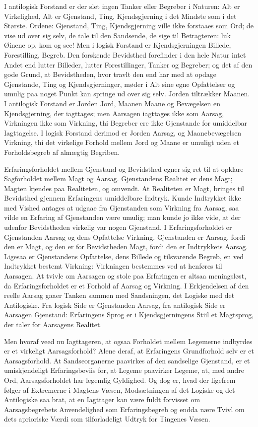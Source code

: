 \documentclass[12pt,a4paper]{book}
\begin{document}
I antilogisk Forstand er der slet ingen Tanker eller Begreber i Naturen:
Alt er Virkelighed, Alt er Gjenstand, Ting, Kjendsgjerning i det Mindste
som i det Største. Ordene: Gjenstand, Ting, Kjendsgjerning ville ikke
forstaaes som Ord; de vise ud over sig selv, de tale til den Sandsende,
de sige til Betragteren: luk Øinene op, kom og see! Men i logisk
Forstand er Kjendsgjerningen Billede, Forestilling, Begreb. Den
forskende Bevidsthed forefinder i den hele Natur intet Andet end lutter
Billeder, lutter Forestillinger, Tanker og Begreber; og det af den gode
Grund, at Bevidstheden, hvor travlt den end har med at opdage
Gjenstande, Ting og Kjendsgjerninger, møder i Alt sine egne Opfattelser
og umulig paa noget Punkt kan springe ud over sig selv. Jorden
tiltrækker Maanen. I antilogisk Forstand er Jorden Jord, Maanen Maane og
Bevægelsen en Kjendsgjerning, der iagttages; men Aarsagen iagttages ikke
som Aarsag, Virkningen ikke som Virkning, thi Begreber ere ikke
Gjenstande for umiddelbar Iagttagelse. I logisk Forstand derimod er
Jorden Aarsag, og Maanebevægelsen Virkning, thi det virkelige Forhold
mellem Jord og Maane er umuligt uden et Forholdsbegreb af almægtig
Begriben.

Erfaringsforholdet mellem Gjenstand og Bevidsthed egner sig ret til at
opklare Sagforholdet mellem Magt og Aarsag. Gjenstandens Realitet er
dens Magt; Magten kjendes
paa Realiteten, og omvendt. At Realiteten er Magt, bringes til
Bevidsthed gjennem Erfaringens umiddelbare Indtryk. Kunde Indtrykket
ikke med Vished antages at udgaae fra Gjenstanden som Virkning fra
Aarsag, saa vilde en Erfaring af Gjenstanden være umulig; man kunde jo
ikke vide, at der udenfor Bevidstheden virkelig var nogen Gjenstand. I
Erfaringsforholdet er Gjenstanden Aarsag og dens Opfattelse Virkning.
Gjenstanden er Aarsag, fordi den er Magt, og den er for Bevidstheden
Magt, fordi den er Indtrykkets Aarsag. Ligesaa er Gjenstandens
Opfattelse, dens Billede og tilsvarende Begreb, en ved Indtrykket
bestemt Virkning: Virkningen bestemmes ved at henføres til Aarsagen. At
tvivle om Aarsagen og stole paa Erfaringen er altsaa meningsløst, da
Erfaringsforholdet er et Forhold af Aarsag og Virkning. I Erkjendelsen
af den reelle Aarsag gaaer Tanken sammen med Sandsningen, det Logiske
med det Antilogiske. Fra logisk Side er Gjenstanden Aarsag, fra
antilogisk Side er Aarsagen Gjenstand: Erfaringens Sprog er i
Kjendsgjerningens Stiil et Magtsprog, der taler for Aarsagens Realitet.

Men hvoraf veed nu Iagttageren, at ogsaa Forholdet mellem Legemerne
indbyrdes er et virkeligt Aarsagsforhold? Alene deraf, at Erfaringens
Grundforhold selv er et Aarsagsforhold. At Sandseorganerne paavirkes af
den sandselige Gjenstand, er et umiskjendeligt Erfaringsbeviis for, at
Legeme paavirker Legeme, at, med andre Ord, Aarsagsforholdet har
legemlig Gyldighed. Og dog er, hvad der ligefrem følger af Extremerne i
Magtens Væsen, Modsætningen af det Logiske og det Antilogiske saa brat,
at en Iagttager kan være fuldt forvisset om Aarsagsbegrebets
Anvendelighed som Erfaringsbegreb og endda nære Tvivl om dets
aprioriske Værdi som tilforladeligt Udtryk for Tingenes Væsen.
\end{document}

